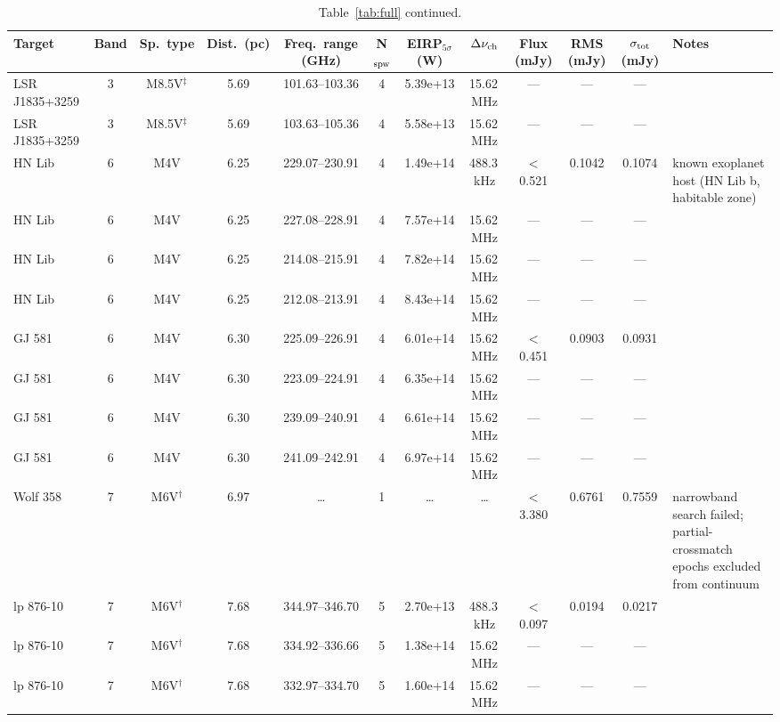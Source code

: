 \documentclass{openjournal}
\begin{document}
\begin{table}
\centering
\scriptsize
\setlength{\tabcolsep}{2pt}
\caption{Table~\ref{tab:full} continued.}
\label{tab:full3}
\begin{tabularx}{\textwidth}{@{}l c c c c c c c c c c X@{}}
\hline
Target & Band & Sp.\ type & Dist.\ (pc) & Freq.\ range (GHz) & N$_{\rm spw}$ & EIRP$_{5\sigma}$ (W) & $\Delta\nu_{\rm ch}$ & Flux (mJy) & RMS (mJy) & $\sigma_{\rm tot}$ (mJy) & Notes \\
\hline
 LSR J1835+3259 & 3 & M8.5V$^\ddagger$ & 5.69 & 101.63--103.36 & 4 & 5.39e+13 & 15.62\,MHz & --- & --- & --- &  \\
 LSR J1835+3259 & 3 & M8.5V$^\ddagger$ & 5.69 & 103.63--105.36 & 4 & 5.58e+13 & 15.62\,MHz & --- & --- & --- &  \\
 HN Lib & 6 & M4V & 6.25 & 229.07--230.91 & 4 & 1.49e+14 & 488.3\,kHz & $<$0.521 & 0.1042 & 0.1074 & known exoplanet host (HN Lib b, habitable zone) \\
 HN Lib & 6 & M4V & 6.25 & 227.08--228.91 & 4 & 7.57e+14 & 15.62\,MHz & --- & --- & --- &  \\
 HN Lib & 6 & M4V & 6.25 & 214.08--215.91 & 4 & 7.82e+14 & 15.62\,MHz & --- & --- & --- &  \\
 HN Lib & 6 & M4V & 6.25 & 212.08--213.91 & 4 & 8.43e+14 & 15.62\,MHz & --- & --- & --- &  \\
 GJ 581 & 6 & M4V & 6.30 & 225.09--226.91 & 4 & 6.01e+14 & 15.62\,MHz & $<$0.451 & 0.0903 & 0.0931 &  \\
 GJ 581 & 6 & M4V & 6.30 & 223.09--224.91 & 4 & 6.35e+14 & 15.62\,MHz & --- & --- & --- &  \\
 GJ 581 & 6 & M4V & 6.30 & 239.09--240.91 & 4 & 6.61e+14 & 15.62\,MHz & --- & --- & --- &  \\
 GJ 581 & 6 & M4V & 6.30 & 241.09--242.91 & 4 & 6.97e+14 & 15.62\,MHz & --- & --- & --- &  \\
 Wolf  358 & 7 & M6V$^\dagger$ & 6.97 & \ldots & 1 & \ldots & \ldots & $<$3.380 & 0.6761 & 0.7559 & narrowband search failed; partial-crossmatch epochs excluded from continuum \\
 lp 876-10 & 7 & M6V$^\dagger$ & 7.68 & 344.97--346.70 & 5 & 2.70e+13 & 488.3\,kHz & $<$0.097 & 0.0194 & 0.0217 &  \\
 lp 876-10 & 7 & M6V$^\dagger$ & 7.68 & 334.92--336.66 & 5 & 1.38e+14 & 15.62\,MHz & --- & --- & --- &  \\
 lp 876-10 & 7 & M6V$^\dagger$ & 7.68 & 332.97--334.70 & 5 & 1.60e+14 & 15.62\,MHz & --- & --- & --- &  \\

\end{tabularx}
\end{table}
\end{document}
